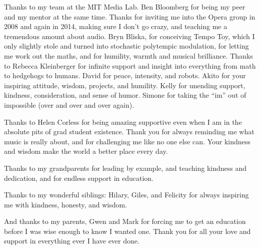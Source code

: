 \begin{fullwidth}
\vspace{5mm}
\noindent Thanks to my team at the MIT Media Lab. Ben Bloomberg for
being my peer and my mentor at the same time. Thanks for inviting me
into the Opera group in 2008 and again in 2014, making sure
I don't go crazy, and teaching me a tremendous amount about
audio. Bryn Bliska, for conceiving Tempo Toy, which I only slightly
stole and turned into stochastic polytempic modulation, for letting me
work out the maths, and for humility, warmth and musical
brilliance. Thanks to Rebecca Kleinberger for infinite support and
insight into everything from math to hedgehogs to humans. David for
peace, intensity, and robots. Akito for your inspiring attitude,
wisdom, projects, and humility. Kelly for unending support, kindness,
consideration, and sense of humor. Simone for taking the ``im'' out of
impossible (over and over and over again).

\vspace{5mm}
\noindent Thanks to Helen Corless for being amazing supportive even
when I am in the absolute pits of grad student existence. Thank you
for always reminding me what music is really about, and for
challenging me like no one else can. Your kindness and wisdom make
the world a better place every day.

\vspace{5mm}
\noindent Thanks to my grandparents for leading by example, and teaching
kindness and dedication, and for endless support in education.

\vspace{5mm}
\noindent Thanks to my wonderful siblings: Hilary, Giles, and Felicity
for always inspiring me with kindness, honesty, and wisdom.

\vspace{5mm}
\noindent And thanks to my parents, Gwen and Mark for forcing me to get an
education before I was wise enough to know I wanted one. Thank you for
all your love and support in everything ever I have ever done.
\end{fullwidth}

